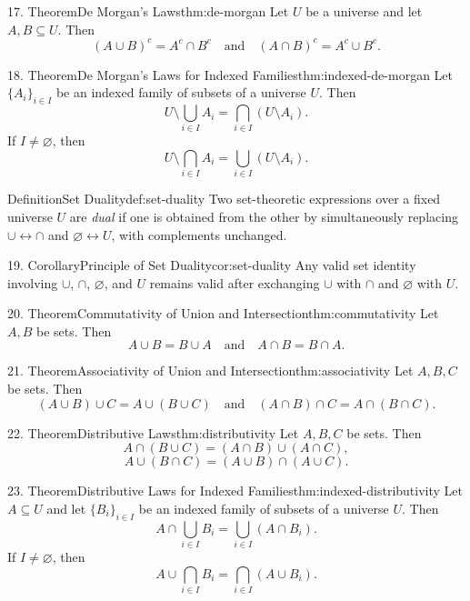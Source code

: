 \documentclass[11pt]{article}
\begin{document}
\begin{studyblock}{17. Theorem}{De Morgan's Laws}{thm:de-morgan}
Let $U$ be a universe and let $A,B \subseteq U$. Then
\[
(A \cup B)^c = A^c \cap B^c
\quad\text{and}\quad
(A \cap B)^c = A^c \cup B^c.
\]
\end{studyblock}
\begin{studyblock}{18. Theorem}{De Morgan's Laws for Indexed Families}{thm:indexed-de-morgan}
Let $\{A_i\}_{i\in I}$ be an indexed family of subsets of a universe $U$.
Then
\[
U\setminus\bigcup_{i\in I}A_i
=
\bigcap_{i\in I}(U\setminus A_i).
\]
If $I\neq\varnothing$, then
\[
U\setminus\bigcap_{i\in I}A_i
=
\bigcup_{i\in I}(U\setminus A_i).
\]
\end{studyblock}
\begin{studyblock}{Definition}{Set Duality}{def:set-duality}
Two set-theoretic expressions over a fixed universe $U$ are \emph{dual} if one
is obtained from the other by simultaneously replacing
$\cup \leftrightarrow \cap$ and $\varnothing \leftrightarrow U$, with
complements unchanged.
\end{studyblock}
\begin{studyblock}{19. Corollary}{Principle of Set Duality}{cor:set-duality}
Any valid set identity involving $\cup$, $\cap$, $\varnothing$, and $U$
remains valid after exchanging $\cup$ with $\cap$ and $\varnothing$ with $U$.
\end{studyblock}
\begin{studyblock}{20. Theorem}{Commutativity of Union and Intersection}{thm:commutativity}
Let $A,B$ be sets. Then
\[
A \cup B = B \cup A
\quad\text{and}\quad
A \cap B = B \cap A.
\]
\end{studyblock}
\begin{studyblock}{21. Theorem}{Associativity of Union and Intersection}{thm:associativity}
Let $A,B,C$ be sets. Then
\[
(A \cup B) \cup C = A \cup (B \cup C)
\quad\text{and}\quad
(A \cap B) \cap C = A \cap (B \cap C).
\]
\end{studyblock}
\begin{studyblock}{22. Theorem}{Distributive Laws}{thm:distributivity}
Let $A,B,C$ be sets. Then
\[
A \cap (B \cup C) = (A \cap B) \cup (A \cap C),
\]
\[
A \cup (B \cap C) = (A \cup B) \cap (A \cup C).
\]
\end{studyblock}
\begin{studyblock}{23. Theorem}{Distributive Laws for Indexed Families}{thm:indexed-distributivity}
Let $A\subseteq U$ and let $\{B_i\}_{i\in I}$ be an indexed family of subsets
of a universe $U$. Then
\[
A\cap\bigcup_{i\in I}B_i
=
\bigcup_{i\in I}(A\cap B_i).
\]
If $I\neq\varnothing$, then
\[
A\cup\bigcap_{i\in I}B_i
=
\bigcap_{i\in I}(A\cup B_i).
\]
\end{studyblock}
\end{document}
